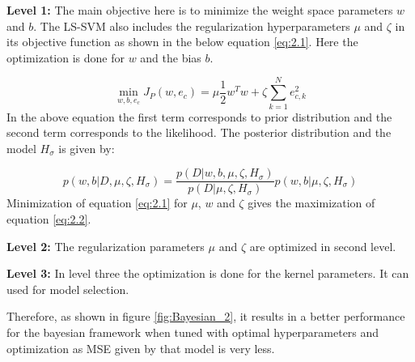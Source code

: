 \textbf{Level 1:} The main objective here is to minimize the weight space parameters $w$ and $b$. The LS-SVM also includes the regularization hyperparameters $\mu$ and $\zeta$ in its objective function as shown in the below equation \ref{eq:2.1}. Here the optimization is done for $w$ and the bias $b$.

\begin{equation}\label{eq:2.1}
\min\limits_{w,b,e_c} J_P(w,e_c) = \mu \frac{1}{2}w^Tw + \zeta \sum_{k=1}^{N}e_{c,k}^2
\end{equation} 
In the above equation the first term corresponds to prior distribution and the second term corresponds to the likelihood. The posterior distribution and the model $H_\sigma$ is given by:

\begin{equation}\label{eq:2.2}
p(w,b|D,\mu,\zeta,H_\sigma) = \frac{p(D|w,b,\mu,\zeta,H_\sigma)}{p(D|\mu,\zeta,H_\sigma)}p(w,b|\mu,\zeta,H_\sigma)
\end{equation}
Minimization of equation \ref{eq:2.1} for $\mu$, $w$ and $\zeta$ gives the maximization of equation \ref{eq:2.2}. 

\textbf{Level 2:} The regularization parameters $\mu$ and $\zeta$ are optimized in second level.

\textbf{Level 3:} In level three the optimization is done for the kernel parameters. It can used for model selection. 

Therefore, as shown in figure \ref{fig:Bayesian_2}, it results in a better performance for the bayesian framework when tuned with optimal hyperparameters and optimization as MSE given by that model is very less.
